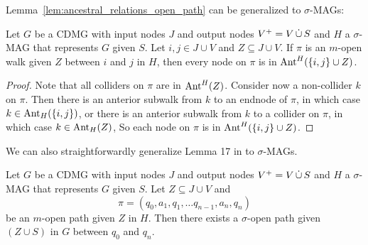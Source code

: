 Lemma~\ref{lem:ancestral_relations_open_path} can be generalized to $\sigma$-MAGs:
\begin{Lem}\label{lem:sigmamag_ancestral_relations_open_path}
  Let $G$ be a CDMG with input nodes $J$ and output nodes $V^+ = V \,\dot{\cup}\, S$ and $H$ a $\sigma$-MAG that represents $G$ given $S$.
  Let $i, j \in J \cup V$ and $Z \subseteq J \cup V$.
  If $\pi$ is an $m$-open walk given $Z$ between $i$ and $j$ in $H$, then 
  every node on $\pi$ is in $\mathrm{Ant}^H(\{i,j\} \cup Z)$.
\end{Lem}
\begin{proof}
  Note that all colliders on $\pi$ are in $\mathrm{Ant}^H(Z)$.
  Consider now a non-collider $k$ on $\pi$. 
  Then there is an anterior subwalk from $k$ to an endnode of $\pi$, in which case $k \in \mathrm{Ant}_H(\{i,j\})$,
  or there is an anterior subwalk from $k$ to a collider on $\pi$, in which case $k \in \mathrm{Ant}_H(Z)$,
  So each node on $\pi$ is in $\mathrm{Ant}^H(\{i,j\}\cup Z)$.
\end{proof}
We can also straightforwardly generalize Lemma 17 in \cite{SpirtesRichardson97} to $\sigma$-MAGs.
\begin{Lem}\label{lem:sigmamag_open_path_implies_cdmg_sigma-open_path}
  Let $G$ be a CDMG with input nodes $J$ and output nodes $V^+ = V \,\dot{\cup}\, S$ and $H$ a $\sigma$-MAG that represents $G$ given $S$.
  Let $Z \subseteq J \cup V$ and
    \[\pi = (q_0, a_1, q_1, \dots q_{n-1}, a_n, q_n)\] 
  be an $m$-open path given $Z$ in $H$.
  Then there exists a $\sigma$-open path given $(Z \cup S)$ in $G$ between $q_0$ and $q_n$.
\end{Lem}
